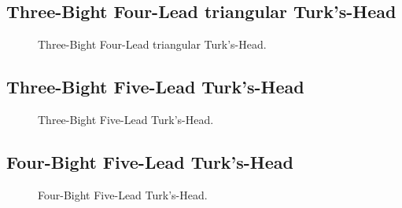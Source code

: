 \subsection{Three-Bight Four-Lead triangular Turk’s-Head}

\begin{figure}[H]\centering
	\begin{minipage}{1\linewidth}
		\begin{center}
			\tcbox[enhanced jigsaw,colframe=black,opacityframe=0.5,opacityback=0.5]
			{\centering{}}
		\end{center}
	\end{minipage}
\caption{Three-Bight Four-Lead triangular Turk’s-Head.}
\label{ris:Turk-Head_4}
\end{figure}

\subsection{Three-Bight Five-Lead Turk’s-Head}

\begin{figure}[H]\centering
	\begin{minipage}{1\linewidth}
		\begin{center}
			\tcbox[enhanced jigsaw,colframe=black,opacityframe=0.5,opacityback=0.5]
			{\centering{}}
		\end{center}
	\end{minipage}
\caption{Three-Bight Five-Lead Turk’s-Head.}
\label{ris:Turk-Head_5}
\end{figure}

\subsection{Four-Bight Five-Lead Turk’s-Head}


\begin{figure}[H]\centering
	\begin{minipage}{1\linewidth}
		\begin{center}
			\tcbox[enhanced jigsaw,colframe=black,opacityframe=0.5,opacityback=0.5]
			{\centering{}}
		\end{center}
	\end{minipage}
\caption{Four-Bight Five-Lead Turk’s-Head.}
\label{ris:Turk-Head_6}
\end{figure}

